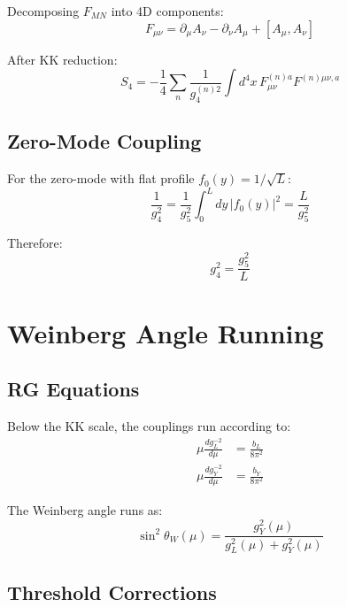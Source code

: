 \documentclass[11pt,a4paper]{article}
\begin{document}
Decomposing $F_{MN}$ into 4D components:
\begin{equation}
\label{eq:fmn-decomp}
F_{\mu\nu} = \partial_\mu A_\nu - \partial_\nu A_\mu + [A_\mu, A_\nu]
\end{equation}

After KK reduction:
\begin{equation}
\label{eq:4d-action}
S_4 = -\frac{1}{4} \sum_n \frac{1}{g_4^{(n)2}} \int d^4x \, F_{\mu\nu}^{(n)a} F^{(n)\mu\nu,a}
\end{equation}

\subsection{Zero-Mode Coupling}
\label{app:zero-mode}

For the zero-mode with flat profile $f_0(y) = 1/\sqrt{L}$:
\begin{equation}
\label{eq:zero-mode-derive}
\frac{1}{g_4^2} = \frac{1}{g_5^2} \int_0^L dy \, |f_0(y)|^2 = \frac{L}{g_5^2}
\end{equation}

Therefore:
\begin{equation}
\label{eq:g4-g5-relation}
g_4^2 = \frac{g_5^2}{L}
\end{equation}

\section{Weinberg Angle Running}
\label{app:running}

\subsection{RG Equations}
\label{app:rg}

Below the KK scale, the couplings run according to:
\begin{align}
\label{eq:rg-gl}
\mu \frac{dg_L^{-2}}{d\mu} &= \frac{b_L}{8\pi^2} \\
\label{eq:rg-gy}
\mu \frac{dg_Y^{-2}}{d\mu} &= \frac{b_Y}{8\pi^2}
\end{align}

The Weinberg angle runs as:
\begin{equation}
\label{eq:weinberg-running}
\sin^2\theta_W(\mu) = \frac{g_Y^2(\mu)}{g_L^2(\mu) + g_Y^2(\mu)}
\end{equation}

\subsection{Threshold Corrections}
\label{app:thresholds}
\end{document}
